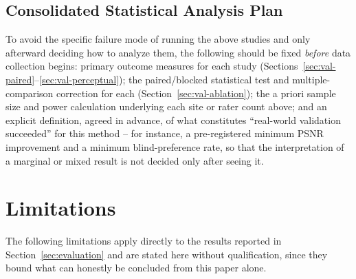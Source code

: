 \documentclass[11pt]{article}
\begin{document}
\subsection{Consolidated Statistical Analysis Plan}
\label{sec:val-stats}

To avoid the specific failure mode of running the above studies and only afterward deciding how to analyze them, the following should be fixed \emph{before} data collection begins: primary outcome measures for each study (Sections~\ref{sec:val-paired}--\ref{sec:val-perceptual}); the paired/blocked statistical test and multiple-comparison correction for each (Section~\ref{sec:val-ablation}); the a priori sample size and power calculation underlying each site or rater count above; and an explicit definition, agreed in advance, of what constitutes ``real-world validation succeeded'' for this method -- for instance, a pre-registered minimum PSNR improvement and a minimum blind-preference rate, so that the interpretation of a marginal or mixed result is not decided only after seeing it.

\section{Limitations}
\label{sec:limitations}

The following limitations apply directly to the results reported in Section~\ref{sec:evaluation} and are stated here without qualification, since they bound what can honestly be concluded from this paper alone.
\end{document}
